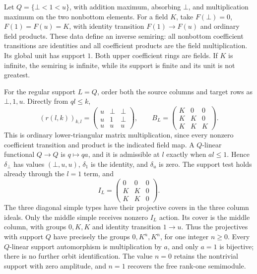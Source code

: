 \begin{example}\label{ex:finite-support-semiperfect}
Let $Q=\{\bot<1<u\}$, with addition maximum, absorbing $\bot$, and
multiplication maximum on the two nonbottom elements. For a field $K$,
take $F(\bot)=0$, $F(1)=F(u)=K$, with identity transition $F(1)\to F(u)$
and ordinary field products. These data define an inverse semiring:
all nonbottom coefficient transitions are identities and all coefficient
products are the field multiplication. Its global unit has support $1$.
Both upper coefficient rings are fields. If $K$ is infinite, the
semiring is infinite, while its support is finite and its unit is not
greatest.

For the regular support $L=Q$, order both the source columns and target
rows as $\bot,1,u$. Directly from $ql\leq k$,
\[
 (r(l,k))_{k,l}=
 \begin{pmatrix}u&\bot&\bot\\u&1&\bot\\u&u&u\end{pmatrix},
 \qquad
 B_L=\begin{pmatrix}K&0&0\\K&K&0\\K&K&K\end{pmatrix}.
\]
This is ordinary lower-triangular matrix multiplication, since every
nonzero coefficient transition and product is the indicated field map.
A $Q$-linear functional $Q\to Q$ is $q\mapsto qa$, and it is
admissible at $l$ exactly when $al\leq1$. Hence $\delta_\bot$ has
values $(\bot,u,u)$, $\delta_1$ is the identity, and $\delta_u$ is
zero. The support test holds already through the $l=1$ term, and
\[
 I_L=\begin{pmatrix}0&0&0\\K&K&0\\K&K&0\end{pmatrix}.
\]
The three diagonal simple types have their projective covers in the
three column ideals. Only the middle simple receives nonzero $I_L$
action. Its cover is the middle column, with groups $0,K,K$ and
identity transition $1\to u$. Thus the projectives with support $Q$
have precisely the groups $0,K^n,K^n$, for one integer $n\geq0$.
Every $Q$-linear support automorphism is multiplication by $a$, and
only $a=1$ is bijective; there is no further orbit identification.
The value $n=0$ retains the nontrivial support with zero amplitude,
and $n=1$ recovers the free rank-one semimodule.
\end{example}
